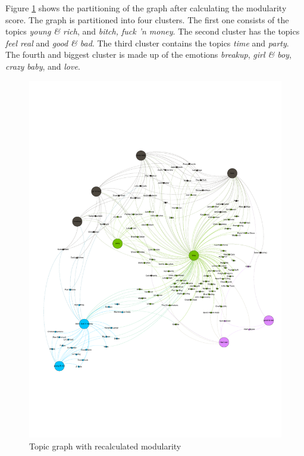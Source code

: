 \documentclass[10pt,a4paper]{article}
\begin{document}
		Figure \ref{fig:topicnewmod} shows the partitioning of the graph after calculating the modularity score. The graph is partitioned into four clusters. The first one consists of the topics \textit{young \& rich}, and \textit{bitch, fuck 'n money}. The second cluster has the topics \textit{feel real} and \textit{good \& bad}. The third cluster contains the topics \textit{time} and \textit{party}. The fourth and biggest cluster is made up of the emotions \textit{breakup}, \textit{girl \& boy}, \textit{crazy baby}, and \textit{love}.
		
		
		\begin{figure}[htb]
			\centering
			\includegraphics[trim=0mm 50mm 0mm 50mm, clip, width=\linewidth]{data/topic_graph_new_modularity}
			\caption{Topic graph with recalculated modularity}
			\label{fig:topicnewmod}
		\end{figure}
		
\end{document}
